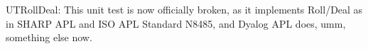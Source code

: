 UTRollDeal: This unit test is now officially broken, as it
implements Roll/Deal as in SHARP APL and ISO APL Standard N8485,
and Dyalog APL does, umm, something else now.

